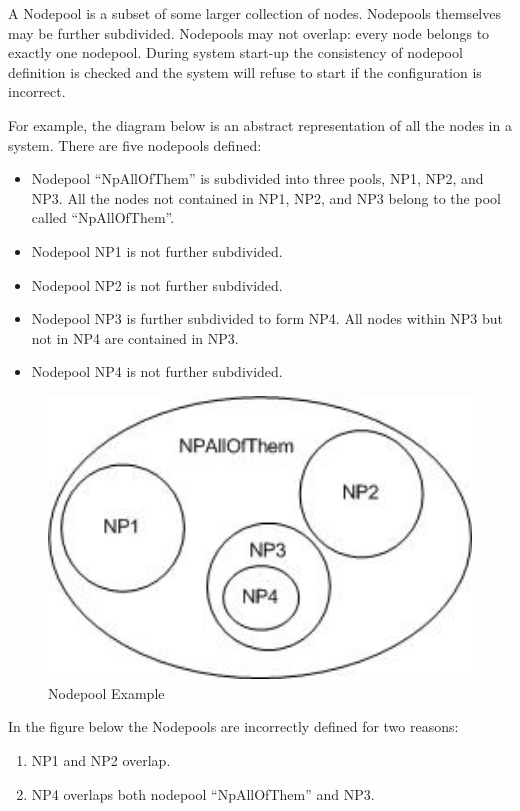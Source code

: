     A Nodepool is a subset of some larger collection of nodes.  Nodepools themselves may be
    further subdivided.  Nodepools may not overlap: every node belongs to exactly
    one nodepool.  During system start-up the consistency of nodepool definition is checked
    and the system will refuse to start if the configuration is incorrect.

    For example, the diagram below is an abstract representation of all the nodes in a
    system.  There are five nodepools defined:
    \begin{itemize}
      \item Nodepool ``NpAllOfThem'' is subdivided into three pools, NP1, NP2, and NP3.  All
        the nodes not contained in NP1, NP2, and NP3 belong to the pool called ``NpAllOfThem''.
      \item Nodepool NP1 is not further subdivided.
      \item Nodepool NP2 is not further subdivided.
      \item Nodepool NP3 is further subdivided to form NP4.  All nodes within NP3 but
        not in NP4 are contained in NP3.
      \item Nodepool NP4 is not further subdivided.
    \end{itemize}

    \begin{figure}[H]
      \centering
      \includegraphics[bb=0 0 241 161, width=5.5in]{images/Nodepool1.jpg}
      \caption{Nodepool Example}
      \label{fig:Nodepools1}
    \end{figure}

    In the figure below the Nodepools are incorrectly defined for two reasons:
    \begin{enumerate}
       \item NP1 and NP2 overlap.
       \item NP4 overlaps both nodepool ``NpAllOfThem'' and NP3.
    \end{enumerate}
    
